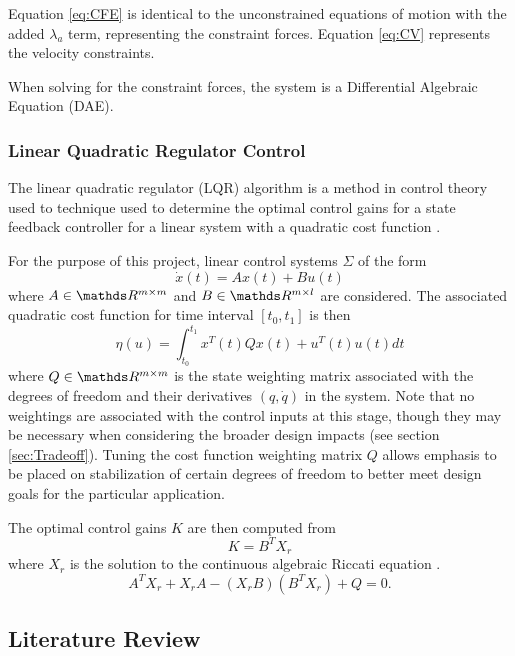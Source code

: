 Equation \ref{eq:CFE} is identical to the unconstrained equations of motion with the added $\lambda_{a}$ term, representing the constraint forces.
Equation \ref{eq:CV} represents the velocity constraints. 
\par
When solving for the constraint forces, the system is a Differential Algebraic Equation (DAE).

\subsubsection{Linear Quadratic Regulator Control}
The linear quadratic regulator (LQR) algorithm is a method in control theory used to technique used to determine the optimal control gains for a state feedback controller for a linear system with a quadratic cost function \cite{LabManual}.

For the purpose of this project, linear control systems $\Sigma$ of the form
\begin{equation}
\dot{x}(t) = Ax(t) + Bu(t)
\end{equation}
where $A \in \R^{m \times m}$ and $B \in \R^{m \times l}$ are considered.
The associated quadratic cost function for time interval $[t_{0},t_{1}]$ is then 
\begin{equation}
\eta(u) = \int_{t_{0}}^{t_{1}}x^{T}(t)Qx(t)+u^{T}(t)u(t)dt
\end{equation}
where $Q \in \R^{m \times m}$ is the state weighting matrix associated with the degrees of freedom and their derivatives $(q, \dot{q})$ in the system. Note that no weightings are associated with the control inputs at this stage, though they may be necessary when considering the broader design impacts (see section \ref{sec:Tradeoff}). Tuning the cost function weighting matrix $Q$ allows emphasis to be placed on stabilization of certain degrees of freedom to better meet design goals for the particular application.

The optimal control gains $K$ are then computed from
\begin{equation}
K = B^{T}X_{r}
\end{equation}
where  $X_{r}$ is the solution to the continuous algebraic Riccati equation \cite{RicattiSolve}.
\begin{equation}
A^{T}X_{r} + X_{r}A - (X_{r}B)(B^{T}X_{r}) + Q = 0.
\end{equation}

\subsection{Literature Review}
